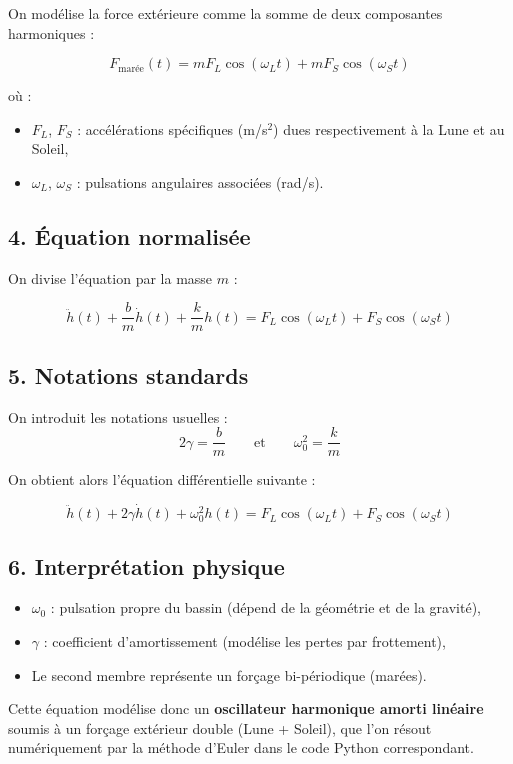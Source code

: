 \documentclass[a4paper,12pt,oneside]{article}
\begin{document}
On modélise la force extérieure comme la somme de deux composantes harmoniques :

\[
F_{\text{marée}}(t) = m F_L \cos(\omega_L t) + m F_S \cos(\omega_S t)
\]

où :
\begin{itemize}
    \item \( F_L \), \( F_S \) : accélérations spécifiques (m/s\(^2\)) dues respectivement à la Lune et au Soleil,
    \item \( \omega_L \), \( \omega_S \) : pulsations angulaires associées (rad/s).
\end{itemize}

\subsection*{4. Équation normalisée}

On divise l'équation par la masse \( m \) :

\[
\ddot{h}(t) + \frac{b}{m} \dot{h}(t) + \frac{k}{m} h(t) = F_L \cos(\omega_L t) + F_S \cos(\omega_S t)
\]

\subsection*{5. Notations standards}

On introduit les notations usuelles :
\[
2\gamma = \frac{b}{m} \qquad \text{et} \qquad \omega_0^2 = \frac{k}{m}
\]

On obtient alors l’équation différentielle suivante :

\[
\boxed{
\ddot{h}(t) + 2\gamma \dot{h}(t) + \omega_0^2 h(t) = F_L \cos(\omega_L t) + F_S \cos(\omega_S t)
}
\]

\subsection*{6. Interprétation physique}

\begin{itemize}
    \item \( \omega_0 \) : pulsation propre du bassin (dépend de la géométrie et de la gravité),
    \item \( \gamma \) : coefficient d’amortissement (modélise les pertes par frottement),
    \item Le second membre représente un forçage bi-périodique (marées).
\end{itemize}

Cette équation modélise donc un \textbf{oscillateur harmonique amorti linéaire} soumis à un forçage extérieur double (Lune + Soleil), que l’on résout numériquement par la méthode d’Euler dans le code Python correspondant.
\end{document}
